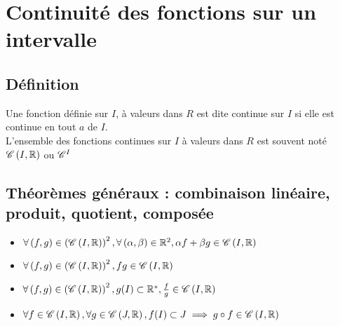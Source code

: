 \section{Continuité des fonctions sur un intervalle}
\subsection{Définition}
\begin{defi}
    Une fonction définie sur \(I\), à valeurs dans \(R\) est dite continue sur \(I\) si elle est continue en tout \(a\) de \(I\). \\
    L’ensemble des fonctions continues sur \(I\) à valeurs dans \(R\) est souvent noté \(\mathscr{C}\left(I,\mathbb{R}\right) \) ou \(\mathscr{C}^{I}\)
\end{defi}
\subsection{Théorèmes généraux : combinaison linéaire, produit, quotient, composée}
\begin{theo}
    \begin{itemize}
        \item \(\forall \left(f,g\right) \in \left(\mathscr{C}\left(I,\mathbb{R}\right)\right)^2,\forall \left(\alpha,\beta\right)\in\mathbb{R}^2,\alpha f + \beta g \in \mathscr{C}\left(I,\mathbb{R}\right)\)
        \item \(\forall \left(f,g\right) \in \left(\mathscr{C}\left(I,\mathbb{R}\right)\right)^2,fg \in \mathscr{C}\left(I,\mathbb{R}\right)\)
        \item \(\forall \left(f,g\right) \in \left(\mathscr{C}\left(I,\mathbb{R}\right)\right)^2,g(I)\subset \mathbb{R}^*,\frac{f}{g}\in \mathscr{C}\left(I,\mathbb{R}\right)\)
        \item \(\forall f \in \mathscr{C}\left(I,\mathbb{R}\right),\forall g \in \mathscr{C}\left(J,\mathbb{R}\right),f(I)\subset J \implies g \circ f \in \mathscr{C}\left(I,\mathbb{R}\right)\)
    \end{itemize}
\end{theo}

